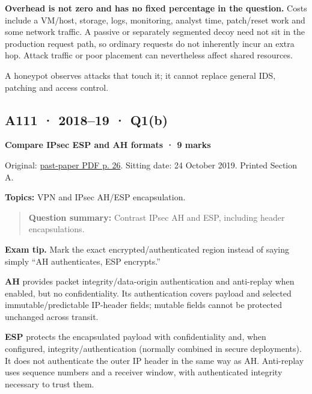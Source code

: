 \documentclass[11pt,a4paper]{article}
\begin{document}
\textbf{Overhead is not zero and has no fixed percentage in the question.} Costs include a VM/\allowbreak{}host,\allowbreak{} storage,\allowbreak{} logs,\allowbreak{} monitoring,\allowbreak{} analyst time,\allowbreak{} patch/\allowbreak{}reset work and some network traffic. A passive or separately segmented decoy need not sit in the production request path,\allowbreak{} so ordinary requests do not inherently incur an extra hop. Attack traffic or poor placement can nevertheless affect shared resources.


A honeypot observes attacks that touch it; it cannot replace general IDS,\allowbreak{} patching and access control.




\clearpage
\subsection{A111 · 2018–19 · Q1(b)}\label{a111}

\textbf{Compare IPsec ESP and AH formats · 9 marks}


Original: \href{../../CSE405-Security_Merged.pdf\#page=26}{past-paper PDF p. 26}. Sitting date: 24 October 2019. Printed Section A.


\textbf{Topics:} VPN and IPsec AH/\allowbreak{}ESP encapsulation.



\begin{quote}\small

\textbf{Question summary:} Contrast IPsec AH and ESP,\allowbreak{} including header encapsulations.



\end{quote}


{\color{ForestGreen}\textbf{Exam tip.} Mark the exact encrypted/\allowbreak{}authenticated region instead of saying simply “AH authenticates,\allowbreak{} ESP encrypts.”}


\textbf{AH} provides packet integrity/\allowbreak{}data-origin authentication and anti-replay when enabled,\allowbreak{} but no confidentiality. Its authentication covers payload and selected immutable/\allowbreak{}predictable IP-header fields; mutable fields cannot be protected unchanged across transit.


\textbf{ESP} protects the encapsulated payload with confidentiality and,\allowbreak{} when configured,\allowbreak{} integrity/\allowbreak{}authentication (normally combined in secure deployments). It does not authenticate the outer IP header in the same way as AH. Anti-replay uses sequence numbers and a receiver window,\allowbreak{} with authenticated integrity necessary to trust them.
\end{document}
